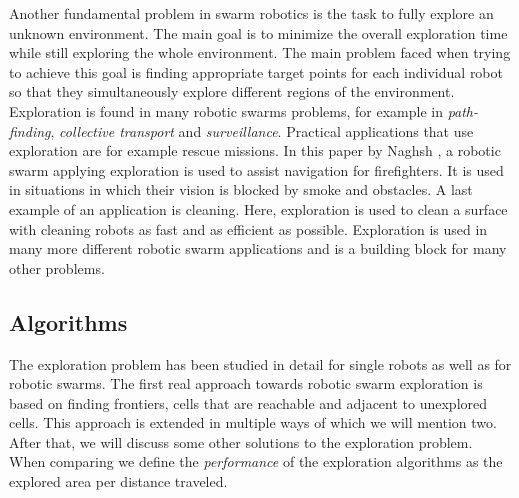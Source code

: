 
Another fundamental problem in swarm robotics is the task to fully explore an unknown environment.
The main goal is to minimize the overall exploration time while still exploring the whole environment. 
The main problem faced when trying to achieve this goal is finding appropriate target points for each individual robot so that they simultaneously explore different regions of the environment. \cite{burgard2005coordinated}
Exploration is found in many robotic swarms problems, for example in \emph{path-finding}, \emph{collective transport} and \emph{surveillance}.
Practical applications that use exploration are for example rescue missions. \cite{Naghsh2008,Penders2011}
In this paper by Naghsh \cite{Naghsh2008}, a robotic swarm applying exploration is used to assist navigation for firefighters.
It is used in situations in which their vision is blocked by smoke and obstacles. 
A last example of an application is cleaning. \cite{wagner2008cooperative}
Here, exploration is used to clean a surface with cleaning robots as fast and as efficient as possible. 
Exploration is used in many more different robotic swarm applications and is a building block for many other problems.

\subsection{Algorithms}
The exploration problem has been studied in detail for single robots \cite{lee1997quantitative,albers1999exploring} as well as for robotic swarms.
The first real approach towards robotic swarm exploration is based on finding frontiers, cells that are reachable and adjacent to unexplored cells. \cite{yamauchi1998frontier} This approach is extended in multiple ways of which we will mention two. \cite{solanas2004coordinated,sheng2006distributed}
After that, we will discuss some other solutions to the exploration problem. \cite{singh1993map,zlot2002multi}
When comparing we define the \emph{performance} of the exploration algorithms as the explored area per distance traveled.

